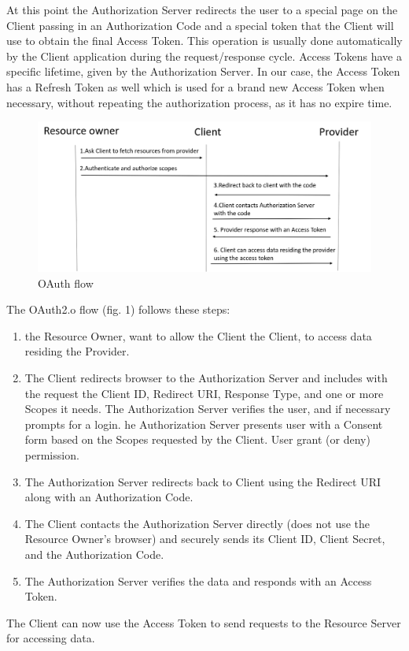 At this point the Authorization Server redirects the user to a special page on the Client passing in an Authorization Code and a special token that the Client will use to obtain the final Access Token. This operation is usually done automatically by the Client application during the request/response cycle. Access Tokens have a specific lifetime, given by the Authorization Server. In our case, the Access Token has a Refresh Token as well which is used for a brand new Access Token when necessary, without repeating the authorization process, as it has no expire time.

\begin{figure}[htb]
	\centering
	\includegraphics[scale=0.3]{figures/oauth.png}
	\caption{OAuth flow}
\end{figure}


	The OAuth2.o flow (fig. 1) follows these steps:
	\begin{enumerate}
		\item the Resource Owner, want to allow the Client the Client, to access data residing the Provider.
		
		\item The Client redirects browser to the Authorization Server and includes with the request the Client ID, Redirect URI, Response Type, and one or more Scopes it needs. The Authorization Server verifies the user, and if necessary prompts for a login. he Authorization Server presents user with a Consent form based on the Scopes requested by the Client. User grant (or deny) permission.
		
		\item The Authorization Server redirects back to Client using the Redirect URI along with an Authorization Code.
		
		\item The Client contacts the Authorization Server directly (does not use the Resource Owner’s browser) and securely sends its Client ID, Client Secret, and the Authorization Code.
		
		\item The Authorization Server verifies the data and responds with an Access Token.
		
	\end{enumerate}
The Client can now use the Access Token to send requests to the Resource Server for accessing data.


